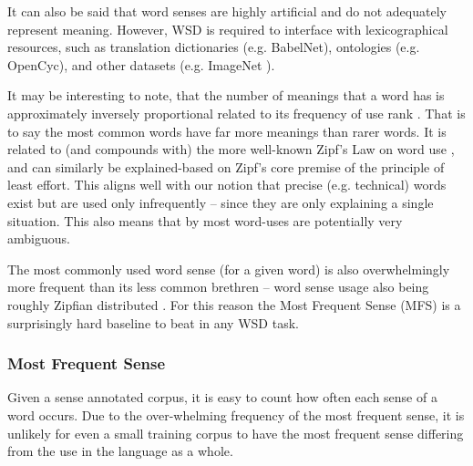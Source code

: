\documentclass[12pt,parskip]{komatufte}
\begin{document}
It can also be said that word senses are highly artificial and do not adequately represent meaning.
However, WSD is required to interface with  lexicographical resources,
such as translation dictionaries (e.g. BabelNet), ontologies (e.g. OpenCyc), and other datasets (e.g. ImageNet ).


It may be interesting to note, that the number of meanings that a word has is approximately inversely proportional related to its frequency of use rank .
That is to say the most common words have far more meanings than rarer words.
It is related to (and compounds with) the more well-known Zipf's Law on word use , and can similarly be explained-based on Zipf's core premise of the principle of least effort. 
This aligns well with our notion that precise (e.g. technical) words exist but are used only infrequently -- since they are only explaining a single situation.
This also means that by most word-uses are potentially very ambiguous.

The most commonly used word sense (for a given word) is also overwhelmingly more frequent than its less common brethren -- word sense usage also being roughly Zipfian distributed .
For this reason the Most Frequent Sense (MFS) is a surprisingly hard baseline to beat in any WSD task.
\subsubsection{Most Frequent Sense}\label{sec:most-frequent-sense}
Given a sense annotated corpus, it is easy to count how often each sense of a word occurs.
Due to the over-whelming frequency of the most frequent sense, it is unlikely for even a small training corpus to have the most frequent sense differing from the use in the language as a whole.
\end{document}
